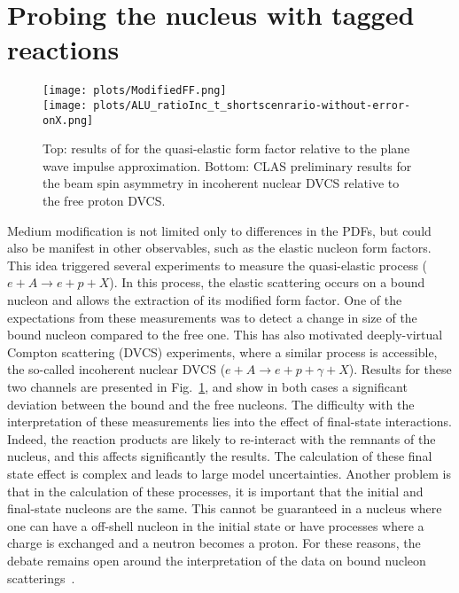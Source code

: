 \section{Probing the nucleus with tagged reactions\label{sec:tagged}} 

\begin{figure}[tbp]
\centering\texttt{[image: plots/ModifiedFF.png]} \\
\centering\texttt{[image: plots/ALU\_ratioInc\_t\_shortscenrario-without-error-onX.png]}
\caption{Top: results of \cite{Strauch:2002wu} for the quasi-elastic form factor relative to
the plane wave impulse approximation. Bottom: CLAS preliminary results 
for the beam spin asymmetry in incoherent nuclear DVCS relative to the free proton DVCS.}
\label{fig:QEincoh}
\end{figure}

Medium modification is not limited only to differences in the PDFs,
but could also be manifest in other observables, such as the elastic nucleon form factors.
This idea
triggered several experiments to measure the quasi-elastic 
process ($e+A \rightarrow e+p+X$). In this process, the 
elastic scattering occurs on a bound nucleon and allows the extraction of its modified 
form factor. One of the expectations from these measurements was to detect a change
in size of the bound nucleon compared to the free one. This has also motivated 
deeply-virtual Compton scattering (DVCS) experiments, where a similar process is accessible, the so-called
incoherent nuclear DVCS ($e+A \rightarrow e+p+\gamma+X$). Results for these two 
channels are presented in Fig.~\ref{fig:QEincoh}, and show in both cases a 
significant deviation between the bound and the free nucleons. 
The difficulty with the interpretation of these measurements lies into the 
effect of final-state interactions. Indeed, the reaction products are likely
to re-interact with the remnants of the nucleus, and this affects significantly the
results. The calculation of these final state effect is complex and leads to large model 
uncertainties. 
Another problem is that in the calculation of these processes, it is important
that the initial and final-state nucleons are the same. This cannot be guaranteed
in a nucleus where one can have a off-shell nucleon in the initial state or 
have processes where a charge is exchanged and a neutron becomes a proton. For
these reasons, the debate remains open around 
the interpretation of the data on bound nucleon scatterings~\cite{Benhar:2006wy}.



